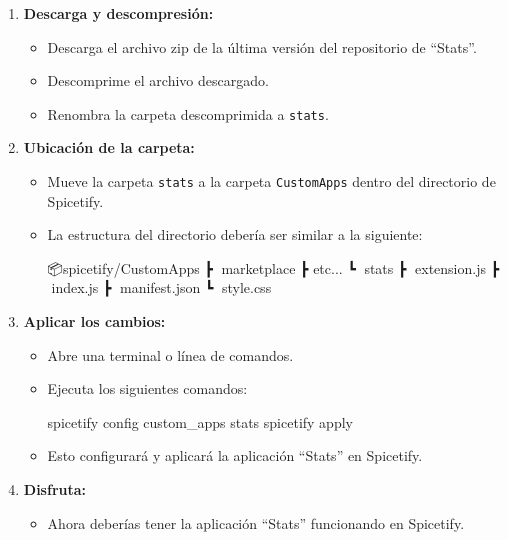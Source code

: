 \documentclass[
  jou,
  floatsintext,
  longtable,
  a4paper,
  nolmodern,
  notxfonts,
  notimes,
  12pt,
  colorlinks=true,linkcolor=blue,citecolor=blue,urlcolor=blue]{apa7}
\newenvironment{Shaded}{\begin{snugshade}}{\end{snugshade}}
\newcommand{\ExtensionTok}[1]{\textcolor[rgb]{0.00,0.23,0.31}{#1}}
\newcommand{\NormalTok}[1]{\textcolor[rgb]{0.00,0.23,0.31}{#1}}
\providecommand{\tightlist}{%
  \setlength{\itemsep}{0pt}\setlength{\parskip}{0pt}}
\begin{document}
\begin{enumerate}
\def\labelenumi{\arabic{enumi}.}
\tightlist
\item
  \textbf{Descarga y descompresión:}

  \begin{itemize}
  \tightlist
  \item
    Descarga el archivo zip de la última versión del repositorio de
    ``Stats''.
  \item
    Descomprime el archivo descargado.
  \item
    Renombra la carpeta descomprimida a \texttt{stats}.
  \end{itemize}
\item
  \textbf{Ubicación de la carpeta:}

  \begin{itemize}
  \item
    Mueve la carpeta \texttt{stats} a la carpeta \texttt{CustomApps}
    dentro del directorio de Spicetify.
  \item
    La estructura del directorio debería ser similar a la siguiente:

\begin{Shaded}
\begin{Highlighting}[]
\ExtensionTok{📦spicetify/CustomApps}
\ExtensionTok{┣}\NormalTok{ 📂marketplace}
\ExtensionTok{┣}\NormalTok{ etc...}
\ExtensionTok{┗}\NormalTok{ 📂stats}
  \ExtensionTok{┣}\NormalTok{ 📜extension.js}
  \ExtensionTok{┣}\NormalTok{ 📜index.js}
  \ExtensionTok{┣}\NormalTok{ 📜manifest.json}
  \ExtensionTok{┗}\NormalTok{ 📜style.css}
\end{Highlighting}
\end{Shaded}
  \end{itemize}
\item
  \textbf{Aplicar los cambios:}

  \begin{itemize}
  \item
    Abre una terminal o línea de comandos.
  \item
    Ejecuta los siguientes comandos:

\begin{Shaded}
\begin{Highlighting}[]
\ExtensionTok{spicetify}\NormalTok{ config custom\_apps stats}
\ExtensionTok{spicetify}\NormalTok{ apply}
\end{Highlighting}
\end{Shaded}
  \item
    Esto configurará y aplicará la aplicación ``Stats'' en Spicetify.
  \end{itemize}
\item
  \textbf{Disfruta:}

  \begin{itemize}
  \tightlist
  \item
    Ahora deberías tener la aplicación ``Stats'' funcionando en
    Spicetify.
  \end{itemize}
\end{enumerate}
\end{document}
